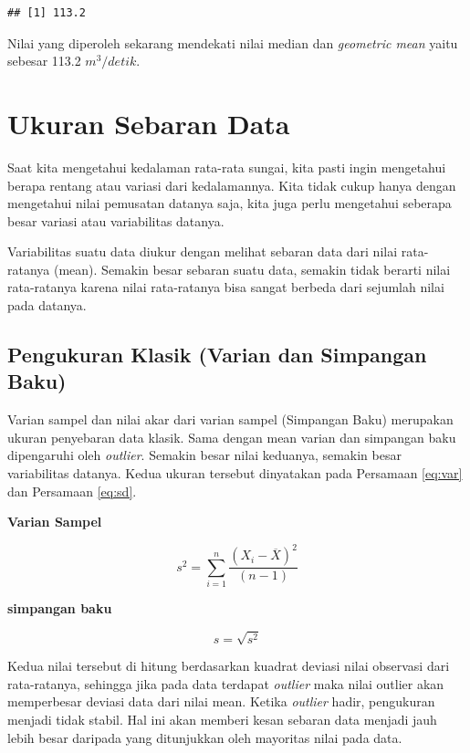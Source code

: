 \documentclass[]{book}
\begin{document}
\begin{verbatim}
## [1] 113.2
\end{verbatim}

Nilai yang diperoleh sekarang mendekati nilai median dan \emph{geometric
mean} yaitu sebesar 113.2 \(m^3/detik\).

\section{Ukuran Sebaran Data}\label{ukuran-sebaran-data}

Saat kita mengetahui kedalaman rata-rata sungai, kita pasti ingin
mengetahui berapa rentang atau variasi dari kedalamannya. Kita tidak
cukup hanya dengan mengetahui nilai pemusatan datanya saja, kita juga
perlu mengetahui seberapa besar variasi atau variabilitas datanya.

Variabilitas suatu data diukur dengan melihat sebaran data dari nilai
rata-ratanya (mean). Semakin besar sebaran suatu data, semakin tidak
berarti nilai rata-ratanya karena nilai rata-ratanya bisa sangat berbeda
dari sejumlah nilai pada datanya.

\subsection{Pengukuran Klasik (Varian dan Simpangan
Baku)}\label{pengukuran-klasik-varian-dan-simpangan-baku}

Varian sampel dan nilai akar dari varian sampel (Simpangan Baku)
merupakan ukuran penyebaran data klasik. Sama dengan mean varian dan
simpangan baku dipengaruhi oleh \emph{outlier}. Semakin besar nilai
keduanya, semakin besar variabilitas datanya. Kedua ukuran tersebut
dinyatakan pada Persamaan \eqref{eq:var} dan Persamaan \eqref{eq:sd}.

\textbf{Varian Sampel}

\begin{equation}
  s^2=\sum_{i=1}^n\frac{\left(X_i-\overline{X}\right)^2}{\left(n-1\right)}
  \label{eq:var}
\end{equation}

\textbf{simpangan baku}

\begin{equation}
  s=\sqrt{s^2}
  \label{eq:sd}
\end{equation}

Kedua nilai tersebut di hitung berdasarkan kuadrat deviasi nilai
observasi dari rata-ratanya, sehingga jika pada data terdapat
\emph{outlier} maka nilai outlier akan memperbesar deviasi data dari
nilai mean. Ketika \emph{outlier} hadir, pengukuran menjadi tidak
stabil. Hal ini akan memberi kesan sebaran data menjadi jauh lebih besar
daripada yang ditunjukkan oleh mayoritas nilai pada data.
\end{document}
